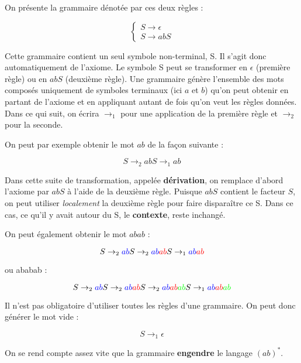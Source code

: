 \begin{example}
On présente la grammaire dénotée par ces deux règles :

\[
\begin{cases}
S \rightarrow \epsilon \\
S \rightarrow abS 
\end{cases}
\]

Cette grammaire contient un seul symbole non-terminal, S. Il s'agit donc automatiquement de l'axiome. Le symbole S peut se transformer en $\epsilon$ (première règle) ou en $abS$ (deuxième règle). Une grammaire génère l'ensemble des mots composés uniquement de symboles terminaux (ici $a$ et $b$) qu'on peut obtenir en partant de l'axiome et en appliquant autant de fois qu'on veut les règles données. Dans ce qui suit, on écrira $\rightarrow_1$ pour une application de la première règle et $\rightarrow_2$ pour la seconde.

On peut par exemple obtenir le mot $ab$ de la façon suivante :

\[
S \rightarrow_2 abS \rightarrow_1 ab
\]

Dans cette suite de transformation, appelée \textbf{dérivation}, on remplace d'abord l'axiome par $abS$ à l'aide de la deuxième règle. Puisque $abS$ contient le facteur $S$, on peut utiliser \textit{localement} la deuxième règle pour faire disparaître ce S. Dans ce cas, ce qu'il y avait autour du S, le \textbf{contexte}, reste inchangé.

On peut également obtenir le mot $abab$ :

\[
S \rightarrow_2 \textcolor{blue}{ab}S \rightarrow_2 \textcolor{blue}{ab}\textcolor{red}{ab}S \rightarrow_1 \textcolor{blue}{ab}\textcolor{red}{ab}
\]

ou ababab :


\[
S \rightarrow_2 \textcolor{blue}{ab}S \rightarrow_2 \textcolor{blue}{ab}\textcolor{red}{ab}S \rightarrow_2 \textcolor{blue}{ab}\textcolor{red}{ab}\textcolor{green}{ab}S \rightarrow_1  \textcolor{blue}{ab}\textcolor{red}{ab}\textcolor{green}{ab}
\]

Il n'est pas obligatoire d'utiliser toutes les règles d'une grammaire. On peut donc générer le mot vide :

\[
S \rightarrow_1 \epsilon
\]

On se rend compte assez vite que la grammaire \textbf{engendre} le langage $(ab)^*$.

\end{example}


